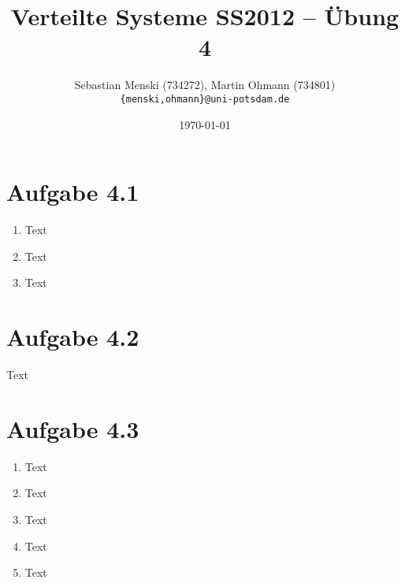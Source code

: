\documentclass[german,12pt,a4paper]{article}
\begin{document}
\title{\textbf{Verteilte Systeme SS2012 -- Übung 4}}
\author{Sebastian Menski (734272), Martin Ohmann (734801) \\ \texttt{\{menski,ohmann\}@uni-potsdam.de}}
\date{\today}

\maketitle

\section*{Aufgabe 4.1}

\begin{enumerate}

	\item Text
	
	\item Text
	
	\item Text

\end{enumerate}

\section*{Aufgabe 4.2}

Text

\section*{Aufgabe 4.3}

\begin{enumerate}

	\item Text
	
	\item Text
	
	\item Text
	
	\item Text
	
	\item Text

\end{enumerate}
\end{document}
